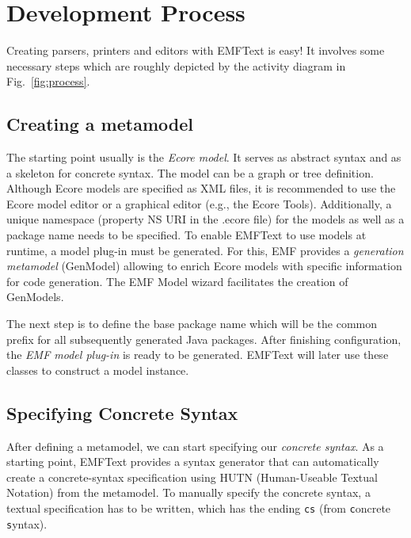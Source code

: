 \chapter{Development Process}

Creating parsers, printers and editors with EMFText is easy! It involves some
necessary steps which are roughly depicted by the activity diagram in
Fig.~\ref{fig:process}.


\section{Creating a metamodel}

The starting point usually is the \emph{Ecore model}. It serves as 
abstract syntax and as a skeleton for concrete syntax. The model can be a graph or tree 
definition. Although Ecore models are specified as XML files, it is recommended 
to use the Ecore model editor or a graphical editor (e.g., the Ecore Tools).
Additionally, a unique namespace (property NS URI in the .ecore file) for the models as well as a package 
name needs to be specified. To enable EMFText to use models at runtime, a model 
plug-in must be generated. For this, EMF provides a \emph{generation
metamodel} (GenModel) allowing to enrich Ecore models with specific information
for code generation. The EMF Model wizard facilitates the creation of GenModels.

The next step is to define the base package name which will be the common prefix 
for all subsequently generated Java packages. After finishing configuration, the 
\emph{EMF model plug-in} is ready to be generated. EMFText will later use
these classes to construct a model instance.

\section{Specifying Concrete Syntax}

After defining a metamodel, we can start specifying our
\emph{concrete syntax}. As a starting point, EMFText provides a syntax generator that can
automatically create a concrete-syntax specification using HUTN (Human-Useable Textual Notation) from the 
metamodel. To manually specify the concrete syntax, a textual specification has to 
be written, which has the ending \texttt{cs} (from \texttt{c}oncrete
\texttt{s}yntax). 

